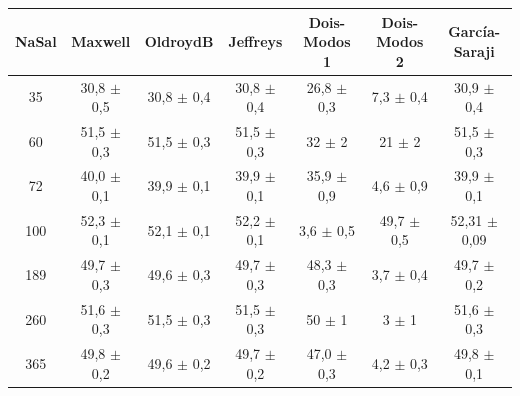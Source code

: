 		\begin{table}[h]
	{%
		\begin{tabular}{c | c c c c c c}
			\toprule
			NaSal & Maxwell             & OldroydB             & Jeffreys             & Dois-Modos 1            & Dois-Modos 2            & García-Saraji      \\ \midrule
			 35   & 30,8    \(\pm\) 0,5 & 30,8     \(\pm\) 0,4 & 30,8     \(\pm\) 0,4 & 26,8        \(\pm\) 0,3 & 7,3         \(\pm\) 0,4 & 30,9  \(\pm\) 0,4  \\
			 60   & 51,5    \(\pm\) 0,3 & 51,5     \(\pm\) 0,3 & 51,5     \(\pm\) 0,3 & 32          \(\pm\) 2   & 21          \(\pm\) 2   & 51,5  \(\pm\) 0,3  \\
			 72   & 40,0    \(\pm\) 0,1 & 39,9     \(\pm\) 0,1 & 39,9     \(\pm\) 0,1 & 35,9        \(\pm\) 0,9 & 4,6         \(\pm\) 0,9 & 39,9  \(\pm\) 0,1  \\
			 100  & 52,3    \(\pm\) 0,1 & 52,1     \(\pm\) 0,1 & 52,2     \(\pm\) 0,1 & 3,6         \(\pm\) 0,5 & 49,7        \(\pm\) 0,5 & 52,31 \(\pm\) 0,09 \\
			 189  & 49,7    \(\pm\) 0,3 & 49,6     \(\pm\) 0,3 & 49,7     \(\pm\) 0,3 & 48,3        \(\pm\) 0,3 & 3,7         \(\pm\) 0,4 & 49,7  \(\pm\) 0,2  \\
			 260  & 51,6    \(\pm\) 0,3 & 51,5     \(\pm\) 0,3 & 51,5     \(\pm\) 0,3 & 50          \(\pm\) 1   & 3           \(\pm\) 1   & 51,6  \(\pm\) 0,3  \\
			 365  & 49,8    \(\pm\) 0,2 & 49,6     \(\pm\) 0,2 & 49,7     \(\pm\) 0,2 & 47,0        \(\pm\) 0,3 & 4,2         \(\pm\) 0,3 & 49,8  \(\pm\) 0,1  \\ \bottomrule
		\end{tabular}
	}{}
\end{table}   
	
